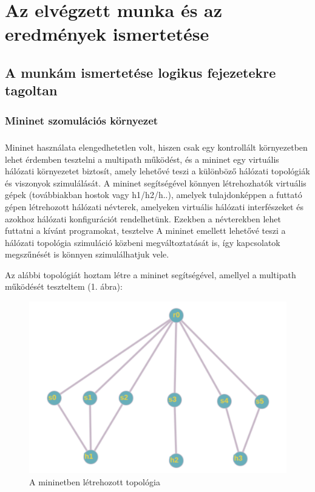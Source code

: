 \documentclass[a4paper,oneside]{article}
\begin{document}
\newpage
\section{Az elvégzett munka és az eredmények ismertetése}
\label{sec:az-elvegzett-munka}


\subsection{A munkám ismertetése logikus fejezetekre tagoltan}
\label{sec:a-munkam-ismert}

\subsubsection{Mininet szomulációs környezet}

 \subparagraph{}

Mininet használata elengedhetetlen volt, hiszen csak egy kontrollált környezetben 
lehet érdemben tesztelni a multipath működést, és a mininet 
egy virtuális hálózati környezetet biztosít, amely lehetővé teszi a különböző 
hálózati topológiák és viszonyok szimulálását. A mininet segítségével könnyen 
létrehozhatók virtuális gépek (továbbiakban hostok vagy h1/h2/h..), 
amelyek tulajdonképpen a futtató gépen létrehozott hálózati névterek, amelyeken virtuális
hálózati interfészeket és azokhoz hálózati konfigurációt rendelhetünk.
Ezekben a névterekben lehet futtatni a kívánt programokat, tesztelve 
A mininet emellett lehetővé teszi a hálózati topológia 
szimuláció közbeni megváltoztatását is, így kapcsolatok megszűnését 
is könnyen szimulálhatjuk vele.


Az alábbi topológiát hoztam létre a mininet segítségével, amellyel a multipath működését teszteltem (1. ábra):

\begin{figure}[h]
  \centering
    \includegraphics[width=12cm]{topo}
\caption{A mininetben létrehozott topológia}
\end{figure}
 
\end{document}
